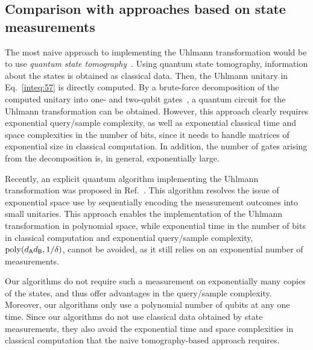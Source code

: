 



\subsection{Comparison with approaches based on state measurements}
\label{sec:comparison with state tom}


The most naive approach to implementing the Uhlmann transformation would be to use \emph{quantum state tomography}~\cite{ODonnell2016EffTomo, Haah2017samploptTomo, Guta2020FastTomo, Apeldoorn2023TomoPurifQuery, Chen2023WhenAdapTomo, hu2024sampleoptimalmemoryefficient}.
Using quantum state tomography, information about the states is obtained as classical data.
Then, the Uhlmann unitary in Eq.~\eqref{inteq:57} is directly computed.
By a brute-force decomposition of the computed unitary into one- and two-qubit gates~\cite{nielsen2010quantum}, a quantum circuit for the Uhlmann transformation can be obtained.
However, this approach clearly requires exponential query/sample complexity, as well as exponential classical time and space complexities in the number of bits, since it needs to handle matrices of exponential size in classical computation.
In addition, the number of gates arising from the decomposition is, in general, exponentially large.


Recently, an explicit quantum algorithm implementing the Uhlmann transformation was proposed in Ref.~\cite{metger2023stateqipspace}. This algorithm resolves the issue of exponential space use by sequentially encoding the measurement outcomes into small unitaries.
This approach enables the implementation of the Uhlmann transformation in polynomial space, while exponential time in the number of bits in classical computation and exponential query/sample complexity, $\mathrm{poly}(d_{\mathsf{A}} d_{\mathsf{B}}, 1/\delta)$, cannot be avoided, as it still relies on an exponential number of measurements.



Our algorithms do not require such a measurement on exponentially many copies of the states, and thus offer advantages in the query/sample complexity. 
Moreover, our algorithms only use a polynomial number of qubits at any one time.
Since our algorithms do not use classical data obtained by state measurements, they also avoid the exponential time and space complexities in classical computation that the naive tomography-based approach requires.



